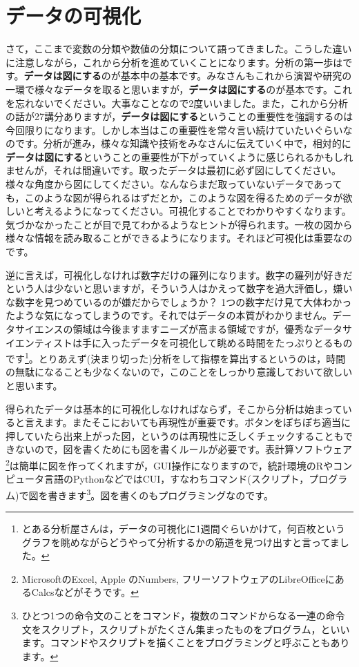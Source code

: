 \documentclass{ltjsbook}
\begin{document}
\section{データの可視化}
\label{dataVisualization}
さて，ここまで変数の分類や数値の分類について語ってきました。こうした違いに注意しながら，これから分析を進めていくことになります。分析の第一歩はです。\textbf{データは図にする}のが基本中の基本です。みなさんもこれから演習や研究の一環で様々なデータを取ると思いますが，\textbf{データは図にする}のが基本です。これを忘れないでください。大事なことなので2度いいました。また，これから分析の話が27講分ありますが，\textbf{データは図にする}ということの重要性を強調するのは今回限りになります。しかし本当はこの重要性を常々言い続けていたいぐらいなのです。分析が進み，様々な知識や技術をみなさんに伝えていく中で，相対的に\textbf{データは図にする}ということの重要性が下がっていくように感じられるかもしれませんが，それは間違いです。取ったデータは最初に必ず図にしてください。様々な角度から図にしてください。なんならまだ取っていないデータであっても，このような図が得られるはずだとか，このような図を得るためのデータが欲しいと考えるようになってください。可視化することでわかりやすくなります。気づかなかったことが目で見てわかるようなヒントが得られます。一枚の図から様々な情報を読み取ることができるようになります。それほど可視化は重要なのです。

逆に言えば，可視化しなければ数字だけの羅列になります。数字の羅列が好きだという人は少ないと思いますが，そういう人はかえって数字を過大評価し，嫌いな数字を見つめているのが嫌だからでしょうか？ 1つの数字だけ見て大体わかったような気になってしまうのです。それではデータの本質がわかりません。データサイエンスの領域は今後ますますニーズが高まる領域ですが，優秀なデータサイエンティストは手に入ったデータを可視化して眺める時間をたっぷりとるものです\footnote{とある分析屋さんは，データの可視化に1週間ぐらいかけて，何百枚というグラフを眺めながらどうやって分析するかの筋道を見つけ出すと言ってました。}。とりあえず(決まり切った)分析をして指標を算出するというのは，時間の無駄になることも少なくないので，このことをしっかり意識しておいて欲しいと思います。

得られたデータは基本的に可視化しなければならず，そこから分析は始まっていると言えます。またそこにおいても再現性が重要です。ボタンをぽちぽち適当に押していたら出来上がった図，というのは再現性に乏しくチェックすることもできないので，図を書くためにも図を書くルールが必要です。表計算ソフトウェア\footnote{MicrosoftのExcel, Apple のNumbers, フリーソフトウェアのLibreOfficeにあるCalcsなどがそうです。}は簡単に図を作ってくれますが，GUI操作になりますので，統計環境のRやコンピュータ言語のPythonなどではCUI，すなわちコマンド(スクリプト，プログラム)で図を書きます\footnote{ひとつ1つの命令文のことをコマンド，複数のコマンドからなる一連の命令文をスクリプト，スクリプトがたくさん集まったものをプログラム，といいます。コマンドやスクリプトを描くことをプログラミングと呼ぶこともあります。}。図を書くのもプログラミングなのです。
\end{document}
